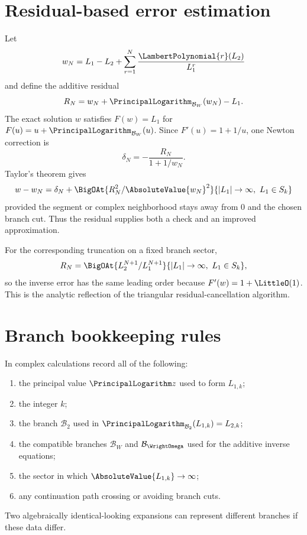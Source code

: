 \documentclass[11pt,oneside]{book}
\theoremstyle{definition}
\theoremstyle{remark}
\newcommand{\LogarithmOnBranch}[2]{%
  \PrincipalLogarithm_{#1}\!\left(#2\right)%
}
\begin{document}
\section{Residual-based error estimation}
Let
\begin{equation}\label{eq:W-truncation}
 w_N=L_1-L_2+\sum_{r=1}^{N}\frac{\LambertPolynomial{r}(L_2)}{L_1^r}
\end{equation}
and define the additive residual
\begin{equation}\label{eq:W-residual}
 R_N=w_N+\LogarithmOnBranch{\mathcal B_W}{w_N}-L_1.
\end{equation}
The exact solution $w$ satisfies $F(w)=L_1$ for
$F(u)=u+\LogarithmOnBranch{\mathcal B_W}{u}$.  Since
$F'(u)=1+1/u$, one Newton correction is
\begin{equation}\label{eq:W-residual-correction}
 \delta_N=-\frac{R_N}{1+1/w_N}.
\end{equation}
Taylor's theorem gives
\begin{equation}\label{eq:W-error-from-residual}
 w-w_N=\delta_N+
 \BigOAt{R_N^2/\AbsoluteValue{w_N}^2}
        {|L_1|\to\infty,\ L_1\in S_k}
\end{equation}
provided the segment or complex neighborhood stays away from $0$ and the
chosen branch cut.  Thus the residual supplies both a check and an improved
approximation.

For the corresponding truncation on a fixed branch sector,
\[
 R_N=\BigOAt{L_2^{N+1}/L_1^{N+1}}
              {|L_1|\to\infty,\ L_1\in S_k},
\]
so the inverse error has the same leading order because $F'(w)=1+\LittleO(1)$.
This is the analytic reflection of the triangular residual-cancellation
algorithm.

\section{Branch bookkeeping rules}
In complex calculations record all of the following:
\begin{enumerate}
\item the principal value $\PrincipalLogarithm z$ used to form $L_{1,k}$;
\item the integer $k$;
\item the branch $\mathcal B_2$ used in
      $\LogarithmOnBranch{\mathcal B_2}{L_{1,k}}=L_{2,k}$;
\item the compatible branches $\mathcal B_W$ and $\mathcal B_\WrightOmega$ used
      for the additive inverse equations;
\item the sector in which $\AbsoluteValue{L_{1,k}}\to\infty$;
\item any continuation path crossing or avoiding branch cuts.
\end{enumerate}
Two algebraically identical-looking expansions can represent different
branches if these data differ.
\end{document}
